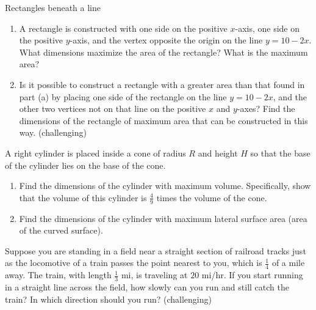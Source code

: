 \documentclass[nooutcomes]{ximera}
\begin{document}
\begin{problem}
Rectangles beneath a line

	\begin{enumerate}
	
	\item  A rectangle is constructed with one side on the positive $x$-axis, one side on the positive $y$-axis, and the vertex opposite the origin on the line $y=10-2x$.  What dimensions maximize the area of the rectangle?  What is the maximum area?
	
	\item  Is it possible to construct a rectangle with a greater area than that found in part (a) by placing one side of the rectangle on the line $y=10-2x$, and the other two vertices not on that line on the positive $x$ and $y$-axes?  Find the dimensions of the rectangle of maximum area that can be constructed in this way. (challenging)
	
	\end{enumerate}
\end{problem}



\begin{problem}
A right cylinder is placed inside a cone of radius $R$ and height $H$ so that the base of the cylinder lies on the base of the cone.

	\begin{enumerate}
	
	\item  Find the dimensions of the cylinder with maximum volume.  Specifically, show that the volume of this cylinder is $\frac{4}{9}$ times the volume of the cone.
	
	\item  Find the dimensions of the cylinder with maximum lateral surface area (area of the curved surface).
	
	\end{enumerate}
\end{problem}



\begin{problem}
Suppose you are standing in a field near a straight section of railroad tracks just as the locomotive of a train passes the point nearest to you, which is $\frac{1}{4}$ of a mile away.  The train, with length $\frac{1}{3}$ mi, is traveling at $20$ mi/hr.  If you start running in a straight line across the field, how slowly can you run and still catch the train?  In which direction should you run? (challenging)
\end{problem}






	
	
	
	
	
	
	
	
	

	










								
				
				
	
\end{document}
